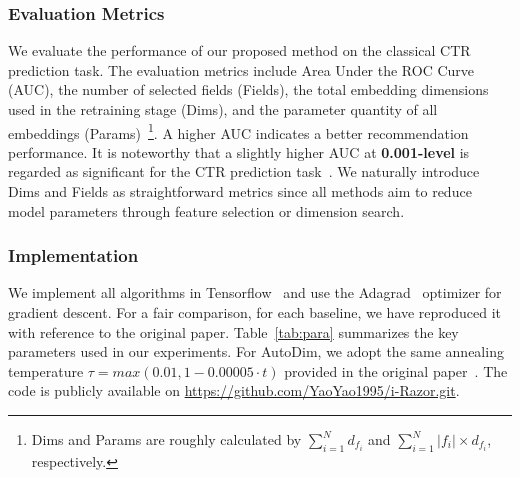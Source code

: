 \documentclass[10pt,journal,compsoc]{IEEEtran}
\begin{document}
\subsubsection{Evaluation Metrics}
We evaluate the performance of our proposed method on the classical CTR prediction task. The evaluation metrics include Area Under the ROC Curve ({AUC}), the number of selected fields ({Fields}), the total embedding dimensions used in the retraining stage ({Dims}), and the parameter quantity of all embeddings ({Params})~\footnote{Dims and Params are roughly calculated by $\sum_{i=1}^N {d}_{f_i}$ and $\sum_{i=1}^N |f_i|\times {d}_{f_i}$, respectively.}. A higher AUC indicates a better recommendation performance.
It is noteworthy that a slightly higher AUC at \textbf{0.001-level} is regarded as significant for the CTR prediction task~\cite{cheng2016wide,zhao2020memory}. We naturally introduce Dims and Fields as straightforward metrics since all methods aim to reduce model parameters through feature selection or dimension search. 


\subsubsection{Implementation}
We implement all algorithms in Tensorflow~\cite{abadi2016tensorflow} and use the Adagrad~\cite{duchi2011adaptive} optimizer for gradient descent. For a fair comparison, for each baseline, we have reproduced it with reference to the original paper. 
Table~\ref{tab:para} summarizes the key parameters used in our experiments. For AutoDim, we adopt the same annealing temperature $\tau = max(0.01, 1-0.00005 \cdot t)$ provided in the original paper~\cite{zhao2020memory}. 
The code is publicly available on \href{https://github.com/YaoYao1995/i-Razor.git}{https://github.com/YaoYao1995/i-Razor.git}.
\end{document}

